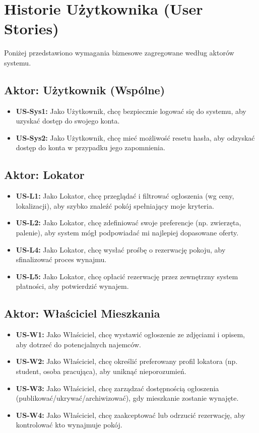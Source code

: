\documentclass[11pt, a4paper]{article}
\begin{document}
\section{Historie Użytkownika (User Stories)}
Poniżej przedstawiono wymagania biznesowe zagregowane według aktorów systemu.

\subsection{Aktor: Użytkownik (Wspólne)}
\begin{itemize}
    \item \textbf{US-Sys1:} Jako Użytkownik, chcę bezpiecznie logować się do systemu, aby uzyskać dostęp do swojego konta.
    \item \textbf{US-Sys2:} Jako Użytkownik, chcę mieć możliwość resetu hasła, aby odzyskać dostęp do konta w przypadku jego zapomnienia.
\end{itemize}

\subsection{Aktor: Lokator}
\begin{itemize}
    \item \textbf{US-L1:} Jako Lokator, chcę przeglądać i filtrować ogłoszenia (wg ceny, lokalizacji), aby szybko znaleźć pokój spełniający moje kryteria.
    \item \textbf{US-L2:} Jako Lokator, chcę zdefiniować swoje preferencje (np. zwierzęta, palenie), aby system mógł podpowiadać mi najlepiej dopasowane oferty.
    \item \textbf{US-L4:} Jako Lokator, chcę wysłać prośbę o rezerwację pokoju, aby sfinalizować proces wynajmu.
    \item \textbf{US-L5:} Jako Lokator, chcę opłacić rezerwację przez zewnętrzny system płatności, aby potwierdzić wynajem.
\end{itemize}

\subsection{Aktor: Właściciel Mieszkania}
\begin{itemize}
    \item \textbf{US-W1:} Jako Właściciel, chcę wystawić ogłoszenie ze zdjęciami i opisem, aby dotrzeć do potencjalnych najemców.
    \item \textbf{US-W2:} Jako Właściciel, chcę określić preferowany profil lokatora (np. student, osoba pracująca), aby uniknąć nieporozumień.
    \item \textbf{US-W3:} Jako Właściciel, chcę zarządzać dostępnością ogłoszenia (publikować/ukrywać/archiwizować), gdy mieszkanie zostanie wynajęte.
    \item \textbf{US-W4:} Jako Właściciel, chcę zaakceptować lub odrzucić rezerwację, aby kontrolować kto wynajmuje pokój.
\end{itemize}
\end{document}
